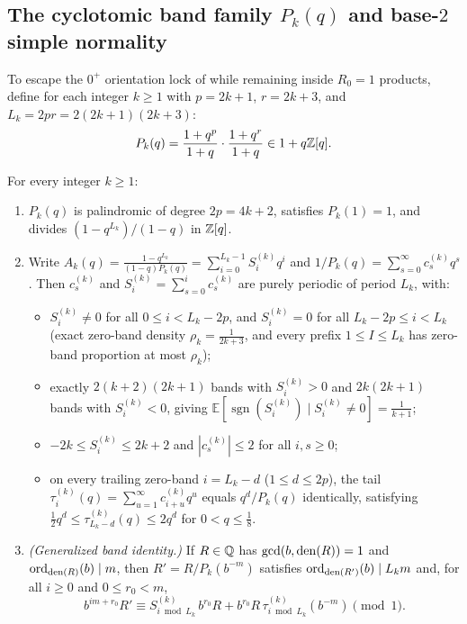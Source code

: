 \documentclass[11pt]{article}
\DeclareMathOperator{\ord}{ord}
\DeclareMathOperator{\sgn}{sgn}
\begin{document}
\subsection{The cyclotomic band family $P_k(q)$ and base-$2$ simple normality}

To escape the $0^+$ orientation lock of  while remaining inside $R_0=1$ products, define for each integer $k\ge1$ with $p=2k+1$, $r=2k+3$, and $L_k=2pr=2(2k+1)(2k+3)$:
\begin{equation}\label{eq:Pk-def}
P_k(q)=\frac{1+q^p}{1+q}\cdot\frac{1+q^r}{1+q}\in 1+q\mathbb Z[q].
\end{equation}

\begin{proposition}\label{prop:Pk-structure}
For every integer $k\ge1$:
\begin{enumerate}[label=\textup{(\roman*)},nosep]
\item $P_k(q)$ is palindromic of degree $2p=4k+2$, satisfies $P_k(1)=1$, and divides $(1-q^{L_k})/(1-q)$ in $\mathbb Z[q]$.
\item Write $A_k(q)=\frac{1-q^{L_k}}{(1-q)P_k(q)}=\sum_{i=0}^{L_k-1}S_i^{(k)}q^i$ and $1/P_k(q)=\sum_{s=0}^\infty c_s^{(k)}q^s$. Then $c_s^{(k)}$ and $S_i^{(k)}=\sum_{s=0}^i c_s^{(k)}$ are purely periodic of period $L_k$, with:
\begin{itemize}[nosep]
\item $S_i^{(k)}\neq0$ for all $0\le i<L_k-2p$, and $S_i^{(k)}=0$ for all $L_k-2p\le i<L_k$ (exact zero-band density $\rho_k=\frac1{2k+3}$, and every prefix $1\le I\le L_k$ has zero-band proportion at most $\rho_k$);
\item exactly $2(k+2)(2k+1)$ bands with $S_i^{(k)}>0$ and $2k(2k+1)$ bands with $S_i^{(k)}<0$, giving $\mathbb E[\sgn(S_i^{(k)})\mid S_i^{(k)}\neq0]=\frac1{k+1}$;
\item $-2k\le S_i^{(k)}\le 2k+2$ and $|c_s^{(k)}|\le2$ for all $i,s\ge0$;
\item on every trailing zero-band $i=L_k-d$ ($1\le d\le 2p$), the tail $\tau_i^{(k)}(q)=\sum_{u=1}^\infty c_{i+u}^{(k)}q^u$ equals $q^d/P_k(q)$ identically, satisfying $\frac12 q^d\le\tau_{L_k-d}^{(k)}(q)\le 2q^d$ for $0<q\le\frac18$.
\end{itemize}
\item \emph{(Generalized band identity.)} If $R\in\mathbb Q$ has $\gcd(b,\operatorname{den}(R))=1$ and $\ord_{\den(R)}(b)\mid m$, then $R'=R/P_k(b^{-m})$ satisfies $\ord_{\den(R')}(b)\mid L_k m$ and, for all $i\ge0$ and $0\le r_0<m$,
\[
b^{im+r_0}R'\equiv S_{i\bmod L_k}^{(k)}\,b^{r_0}R+b^{r_0}R\,\tau_{i\bmod L_k}^{(k)}(b^{-m})\pmod1.
\]
\end{enumerate}
\end{proposition}
\end{document}
